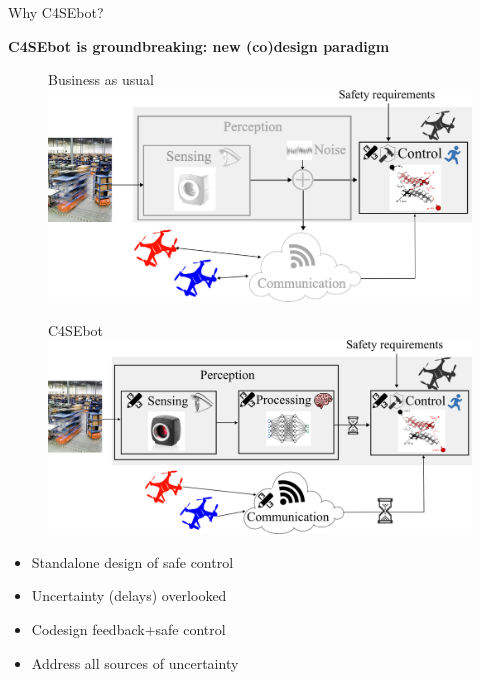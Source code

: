 \documentclass[10pt,xcolor={dvipsnames}]{beamer}
\begin{document}
	\begin{frame}{Why C4SEbot?}
		
		\textbf{C4SEbot is groundbreaking: new (co)design paradigm}\vspace{2mm}
		
		\begin{figure}
			\centering
			\begin{minipage}[l]{.49\linewidth}
				\centering
				Business as usual\vspace{2mm}\\
				\includegraphics[height=.48\linewidth]{scheme_bau}
			\end{minipage}
			\hfil
			\begin{minipage}[r]{.49\linewidth}
				\centering
				C4SEbot\vspace{2mm}\\
				\includegraphics[height=.48\linewidth]{scheme_robust_codesign_comm}
			\end{minipage}
		\end{figure}
		
		\begin{minipage}[l]{.5\linewidth}
			\begin{itemize}[label=\faThumbsODown]
				\item Standalone design of safe control
				\item Uncertainty (delays) overlooked
			\end{itemize}
		\end{minipage}%
		\begin{minipage}[r]{.5\linewidth}
			\begin{itemize}[label=\faThumbsOUp]
				\item Codesign feedback+safe control
				\item Address all sources of uncertainty
			\end{itemize}
		\end{minipage}
		

\end{frame}
\end{document}
